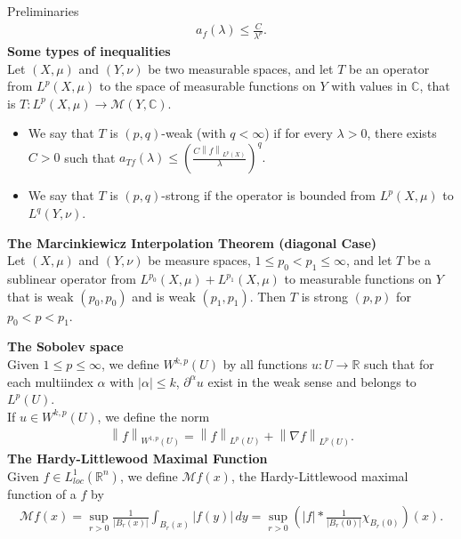 \documentclass[final]{beamer}
\providecommand{\norm}[1]{\left\|#1\right\|}
\newlength{\colwidth}
\begin{document}
\begin{frame}[t]
\begin{columns}[t]
\begin{column}{\colwidth}
\begin{block}{Preliminaries}
\begin{align*}
      a_{f}(\lambda)\leq \frac{C}{\lambda^p}.
    \end{align*}
    \textbf{Some types of inequalities}\\
    Let $(X,\mu)$ and $(Y, \nu)$ be two measurable spaces, and let $T$ be an operator from $L^{p}(X,\mu)$ to the space of measurable functions on $Y$ with values in $\mathbb{C}$, that is $T:L^p(X,\mu)\to\mathcal{M}(Y,\mathbb{C})$.
    \begin{itemize}
        \item[i.] We say that $T$ is $(p,q)$-weak (with $q<\infty$) if for every $\lambda>0$, there exists $C>0$ such that $a_{Tf}(\lambda)\leq \left(\frac{C\norm{f}_{L^{p}(X)}}{\lambda}\right)^q.$
        \item[iii.] We say that $T$ is $(p,q)$-strong if the operator is bounded from $L^p(X,\mu)$ to $L^q(Y,\nu)$.
    \end{itemize}
    
    \textbf{The Marcinkiewicz Interpolation Theorem (diagonal Case)}\\
    Let $(X, \mu)$ and $(Y, \nu)$ be measure spaces, $1 \leq p_0 < p_1 \leq \infty$, and let $T$ be a sublinear operator from $L^{p_0}(X, \mu) + L^{p_1}(X, \mu)$ to measurable functions on $Y$ that is weak $\left(p_0, p_0\right)$ and is weak $\left(p_1, p_1\right)$. Then $T$ is strong $(p, p)$ for $p_0 < p < p_1$.

    \textbf{The Sobolev space}\\
    Given $1\leq p\leq \infty$, we define $W^{k,p}(U)$ by all functions $u:U\to \mathbb{R}$ such that for each multiindex $\alpha$ with $|\alpha|\leq k$, $\partial^{\alpha}u$ exist in the weak sense and belongs to $L^{p}(U)$.\\
    If $u\in W^{k,p}(U)$, we define the norm
    \begin{align*}
      \norm{f}_{W^{1,p}(U)}=\norm{f}_{L^p(U)}+\norm{\nabla f}_{L^p(U)}.
    \end{align*}
    \textbf{The Hardy-Littlewood Maximal Function}\\
    Given $f\in L^1_{loc}(\mathbb{R}^{n})$, we define $\mathcal{M}f(x)$, the Hardy-Littlewood maximal function of a $f$ by
    \begin{align*}
      \mathcal{M}f(x)=\sup_{r>0}\frac{1}{|B_r(x)|}\int_{B_r(x)}|f(y)|\,dy=\sup_{r>0}\left(|f|*\frac{1}{|B_r(0)|}\chi_{B_r(0)}\right)(x).
    \end{align*}
  \end{block}


\end{column}
\end{columns}
\end{frame}
\end{document}
